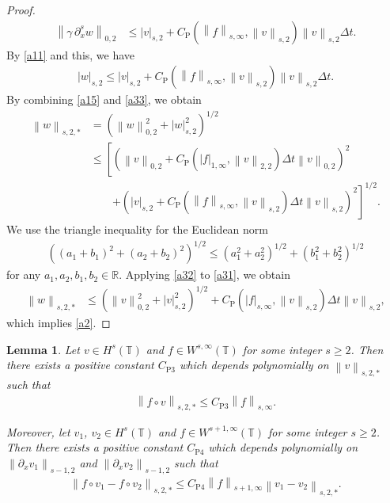 \documentclass[10pt,a4paper,tbtags,leqno]{amsart}
\newtheorem{lemma}[theorem]{Lemma}
\theoremstyle{definition}
\numberwithin{equation}{section}
\def\norm#1#2{\left\|#2\right\|_{#1}}
\def\snorm#1#2{\left|#2\right|_{#1}}
\begin{document}
\begin{proof}
  \begin{align} 
    \norm{0, 2}{\gamma \, \partial_x^s w} & \leq \snorm{s, 2}{v} + C_{\mathrm{P}} (\norm{s, \infty}{f}, \norm{s, 2}{v}) \norm{s, 2}{v} \Delta t. 
  \end{align} 
  By \eqref{a11} and this, we have 
  \begin{align}
    \snorm{s, 2}{w} \leq \snorm{s, 2}{v} + C_{\mathrm{P}} (\norm{s, \infty}{f}, \norm{s, 2}{v}) \norm{s, 2}{v} \Delta t. \label{a33} 
  \end{align}
  By combining \eqref{a15} and \eqref{a33}, we obtain 
  \begin{align}
    \norm{s, 2, \ast}{w} & = \left(\norm{0, 2}{w}^2 + \snorm{s, 2}{w}^2\right)^{1/2} \\ & \leq \left[\left(\norm{0, 2}{v} + C_{\mathrm{P}} (\snorm{1, \infty}{f}, \norm{2, 2}{v}) \Delta t \norm{0, 2}{v} \right)^2 \right. \\ & \qquad \left. + \left(\snorm{s, 2}{v} + C_{\mathrm{P}} (\norm{s, \infty}{f}, \norm{s, 2}{v}) \Delta t \norm{s,2}{v}\right)^2 
    \right]^{1/2}. \label{a31} 
  \end{align} 
  We use the triangle inequality for the Euclidean norm 
  \begin{align}
    \left((a_1 + b_1)^2 + (a_2 + b_2)^2\right)^{1/2} \leq (a_1^2 + a_2^2)^{1/2} + (b_1^2 + b_2^2)^{1/2} \label{a32}
  \end{align} 
  for any $ a_1, a_2, b_1, b_2 \in \mathbb{R} $. 
  Applying \eqref{a32} to \eqref{a31}, we obtain 
  \begin{align}
    \norm{s, 2, \ast}{w} & \leq \left(\norm{0, 2}{v}^2 + \snorm{s, 2}{v}^2\right)^{1/2} + C_{\mathrm{P}} (\snorm{s, \infty}{f}, \norm{s, 2}{v}) \Delta t \norm{s,2}{v}, 
  \end{align}
  which implies \eqref{a2}. 
\end{proof} 

\begin{lemma}\label{lem:a1} 
  Let $ v \in H^s (\mathbb{T}) $ and $ f \in W^{s, \infty} (\mathbb{T}) $ for some integer $ s \geq 2 $. Then there exists a positive constant $ C_{\mathrm{P}3} $ which depends polynomially on $ \norm{s, 2, \ast}{v} $ such that 
  \begin{align} 
    \norm{s, 2, \ast}{f \circ v} \leq C_{\mathrm{P}3} \norm{s, \infty}{f}. \label{ap1} 
  \end{align} 
  
  Moreover, let $ v_1 $, $v_2 \in H^s (\mathbb{T}) $ and $ f \in W^{s + 1, \infty} (\mathbb{T}) $ for some integer $ s \geq 2 $. Then there exists a positive constant $ C_{\mathrm{P}4} $ which depends polynomially on $ \norm{s - 1, 2}{\partial_x v_1} $ and $ \norm{s - 1, 2} {\partial_x v_2} $ such that 
  \begin{align} 
    \norm{s, 2, \ast}{f \circ v_1 - f \circ v_2} \leq C_{\mathrm{P}4} \norm{s + 1, \infty}{f} \norm{s, 2, \ast}{v_1 - v_2}. \label{ap2} 
  \end{align} 
\end{lemma}
\end{document}

